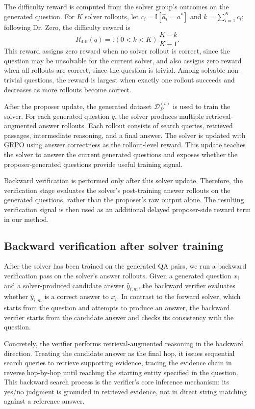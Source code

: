 \documentclass{article}
\begin{document}
The difficulty reward is computed from the solver group's outcomes on the
generated question. For $K$ solver rollouts, let $c_i = \mathbb{I}[\hat{a}_i = a^\ast]$ and $k = \sum_{i=1}^{K} c_i$; following Dr. Zero, the difficulty reward is
\[
R_{\mathrm{diff}}(q) = \mathbb{I}(0 < k < K)\,\frac{K-k}{K-1}.
\]
This reward assigns zero reward when no solver rollout is correct, since the
question may be unsolvable for the current solver, and also assigns zero reward
when all rollouts are correct, since the question is trivial. Among solvable
non-trivial questions, the reward is largest when exactly one rollout succeeds
and decreases as more rollouts become correct.

After the proposer update, the generated dataset $\mathcal{D}_P^{(t)}$ is used
to train the solver. For each generated question $q$, the solver produces
multiple retrieval-augmented answer rollouts. Each rollout consists of search
queries, retrieved passages, intermediate reasoning, and a final answer. The
solver is updated with GRPO using answer correctness as the rollout-level
reward. This update teaches the solver to answer the current generated
questions and exposes whether the proposer-generated questions provide useful
training signal.

Backward verification is performed only after this solver update. Therefore,
the verification stage evaluates the solver's post-training answer rollouts on
the generated questions, rather than the proposer's raw output alone. The
resulting verification signal is then used as an additional delayed
proposer-side reward term in our method.


\subsection{Backward verification after solver training}

After the solver has been trained on the generated QA pairs, we run a
backward verification pass on the solver's answer rollouts. Given a generated
question $x_i$ and a solver-produced candidate answer $\hat{y}_{i,m}$, the
backward verifier evaluates whether $\hat{y}_{i,m}$ is a correct answer to
$x_i$. In contrast to the forward solver, which starts from the question and
attempts to produce an answer, the backward verifier starts from the candidate
answer and checks its consistency with the question.

Concretely, the verifier performs retrieval-augmented reasoning in the backward direction.
Treating the candidate answer as the final hop, it issues sequential search queries to retrieve supporting evidence, tracing the evidence chain in reverse hop-by-hop until reaching the starting entity specified in the question.
This backward search process is the verifier's core inference mechanism: its yes/no judgment is grounded in retrieved evidence, not in direct string matching against a reference answer.
\end{document}
